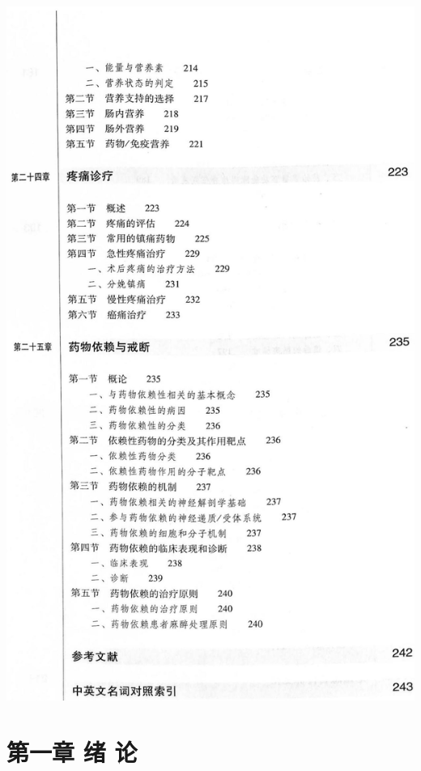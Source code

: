 \documentclass[10pt]{article}
\begin{document}
\begin{center}
\includegraphics[max width=\textwidth]{2024_07_09_002a177993bd97d1d6d7g-025}
\end{center}

\section*{第一章 绪 论}
\end{document}
